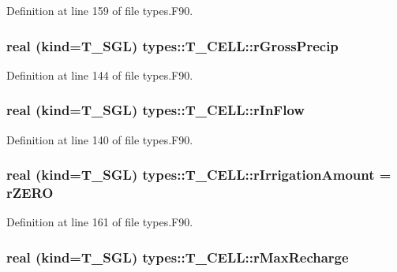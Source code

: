 Definition at line 159 of file types.F90.

\hypertarget{typetypes_1_1_t___c_e_l_l_aa643c443df7bde324d32b00c2c1d80a6}{
\subsubsection[{rGrossPrecip}]{\setlength{\rightskip}{0pt plus 5cm}real (kind={\bf T\_\-SGL}) {\bf types::T\_\-CELL::rGrossPrecip}}}
\label{typetypes_1_1_t___c_e_l_l_aa643c443df7bde324d32b00c2c1d80a6}


Definition at line 144 of file types.F90.

\hypertarget{typetypes_1_1_t___c_e_l_l_a236f20cb8f380308c27d0f5d5dceba75}{
\subsubsection[{rInFlow}]{\setlength{\rightskip}{0pt plus 5cm}real (kind={\bf T\_\-SGL}) {\bf types::T\_\-CELL::rInFlow}}}
\label{typetypes_1_1_t___c_e_l_l_a236f20cb8f380308c27d0f5d5dceba75}


Definition at line 140 of file types.F90.

\hypertarget{typetypes_1_1_t___c_e_l_l_a10aa0cef0074abddb47523b55bd1e179}{
\subsubsection[{rIrrigationAmount}]{\setlength{\rightskip}{0pt plus 5cm}real (kind={\bf T\_\-SGL}) {\bf types::T\_\-CELL::rIrrigationAmount} = {\bf rZERO}}}
\label{typetypes_1_1_t___c_e_l_l_a10aa0cef0074abddb47523b55bd1e179}


Definition at line 161 of file types.F90.

\hypertarget{typetypes_1_1_t___c_e_l_l_a9b095ffb106e69e548d435ed432be83a}{
\subsubsection[{rMaxRecharge}]{\setlength{\rightskip}{0pt plus 5cm}real (kind={\bf T\_\-SGL}) {\bf types::T\_\-CELL::rMaxRecharge}}}
\label{typetypes_1_1_t___c_e_l_l_a9b095ffb106e69e548d435ed432be83a}


